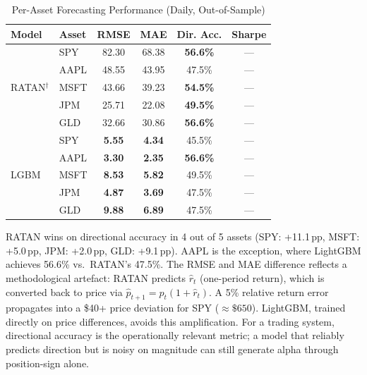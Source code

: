 \documentclass[conference]{IEEEtran}
\begin{document}
\begin{table}[ht]
\centering
\caption{Per-Asset Forecasting Performance (Daily, Out-of-Sample)}
\label{tab:per_asset}
\begin{tabular}{@{}llcccc@{}}
\toprule
\textbf{Model} & \textbf{Asset} & \textbf{RMSE} & \textbf{MAE} & \textbf{Dir. Acc.} & \textbf{Sharpe} \\
\midrule
\multirow{5}{*}{RATAN$^\dagger$}
& SPY  & 82.30 & 68.38 & \textbf{56.6\%} & --- \\
& AAPL & 48.55 & 43.95 & 47.5\% & --- \\
& MSFT & 43.66 & 39.23 & \textbf{54.5\%} & --- \\
& JPM  & 25.71 & 22.08 & \textbf{49.5\%} & --- \\
& GLD  & 32.66 & 30.86 & \textbf{56.6\%} & --- \\
\midrule
\multirow{5}{*}{LGBM}
& SPY  & \textbf{5.55} & \textbf{4.34} & 45.5\% & --- \\
& AAPL & \textbf{3.30} & \textbf{2.35} & \textbf{56.6\%} & --- \\
& MSFT & \textbf{8.53} & \textbf{5.82} & 49.5\% & --- \\
& JPM  & \textbf{4.87} & \textbf{3.69} & 47.5\% & --- \\
& GLD  & \textbf{9.88} & \textbf{6.89} & 47.5\% & --- \\
\bottomrule
\end{tabular}
\end{table}

\smallskip{}

RATAN wins on directional accuracy in 4 out of 5 assets (SPY: +11.1\,pp, MSFT: +5.0\,pp, JPM: +2.0\,pp, GLD: +9.1\,pp). AAPL is the exception, where LightGBM achieves 56.6\% vs.\ RATAN's 47.5\%. The RMSE and MAE difference reflects a methodological artefact: RATAN predicts $\hat{r}_t$ (one-period return), which is converted back to price via $\hat{p}_{t+1} = p_t(1+\hat{r}_t)$. A 5\% relative return error propagates into a \$40+ price deviation for SPY ($\approx\$650$). LightGBM, trained directly on price differences, avoids this amplification. For a trading system, directional accuracy is the operationally relevant metric; a model that reliably predicts direction but is noisy on magnitude can still generate alpha through position-sign alone.
\end{document}
